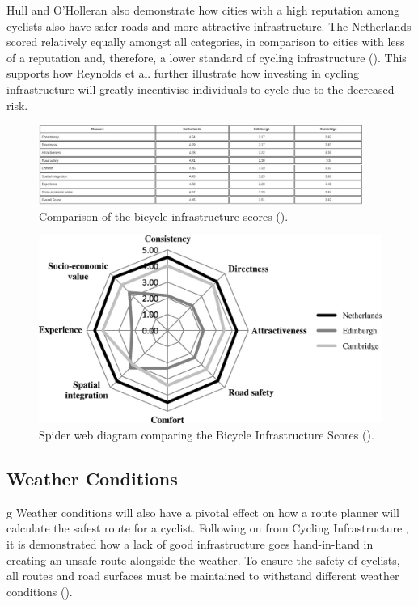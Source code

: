 Hull and O'Holleran also demonstrate how cities with a high reputation among cyclists also have safer roads and more attractive infrastructure. The Netherlands scored relatively equally amongst all categories, in comparison to cities with less of a reputation and, therefore, a lower standard of cycling infrastructure   (\cite{hull_bicycle_2014}). This supports how Reynolds et al. further illustrate how investing in cycling infrastructure will greatly incentivise individuals to cycle due to the decreased risk. 

\begin{figure}
    \centering
    \includegraphics[width=400px, keepaspectratio]{figures/bicycle_infrastructure_score_table.jpg}
    \caption{Comparison of the bicycle infrastructure scores (\cite{hull_bicycle_2014}).}
    \label{fig:bicycleinfrastructurescorestable}
\end{figure}

\begin{figure}
    \centering
    \includegraphics{figures/bicycle_infrastructure_scores.jpg}
    \caption{Spider web diagram comparing the Bicycle Infrastructure Scores (\cite{hull_bicycle_2014}).}
    \label{fig:bicycleinfrastructurescores}
\end{figure}

\subsection{Weather Conditions}
\label{litrev:weatherconditions}g
Weather conditions will also have a pivotal effect on how a route planner will calculate the safest route for a cyclist. Following on from Cycling Infrastructure , it is demonstrated how a lack of good infrastructure goes hand-in-hand in creating an unsafe route alongside the weather. To ensure the safety of cyclists, all routes and road surfaces must be maintained to withstand different weather conditions (\cite{shoman_evaluation_2023}).

